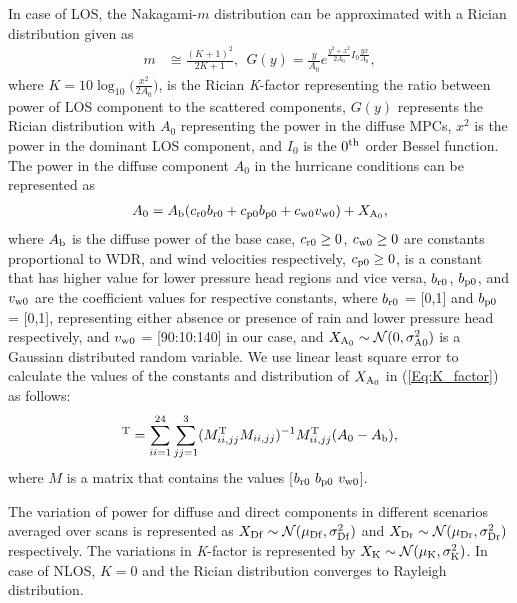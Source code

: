 \documentclass[conference]{IEEEtran}
\begin{document}
In case of LOS, the Nakagami-$m$ distribution can be approximated with a Rician distribution \cite{rician} given as 
\begin{align}
m &\cong \frac{(K+1)^2}{2K + 1}, \ \ G(y)  = \frac{y}{A_{0}}e^{\frac{y^2+x^2}{2A_{0}}I_{0}\frac{yx}{A_{0}}},
\end{align}
 where $K  = 10\log_{10}\big(\frac{x^2}{2A_{0}}\big)$, is the Rician \textit{K}-factor representing the ratio between power of LOS component to the scattered components, $G(y)$ represents the Rician distribution with $A_{0}$ representing the power in the diffuse MPCs, $x^2$ is the power in the dominant LOS component, and $I_{0}$ is the $0^{\rm th}$ order Bessel function. The power in the diffuse component $A_{0}$ in the hurricane conditions can be represented as
\begin{align}
A_{0}= A_{\rm b}(c_{\rm r0}b_{\rm r0} + c_{\rm p0}b_{\rm p0} + c_{\rm w0}v_{\rm w0}) + X_{\rm A_0}, \label{Eq:K_factor}
\end{align}
where $A_{\rm b}$ is the diffuse power of the base case, $c_{\rm r0}\geq0$, $c_{\rm w0}\geq0$ are constants proportional to WDR, and wind velocities respectively, $c_{\rm p0}\geq0$, is a constant that has higher value for lower pressure head regions and vice versa, $b_{\rm r0}$, $b_{\rm p0}$, and $v_{\rm w0}$ are the coefficient values for respective constants, where $b_{\rm r0}$ = [0,1] and $b_{\rm p0}$ = [0,1], representing either absence or presence of rain and lower pressure head respectively, and $v_{\rm w0}$ = [90:10:140] in our case, and $X_{\rm A_0}\sim\mathcal{N}(0,\sigma_{\rm A0}^2)$ is a Gaussian distributed random variable. We use linear least square error to calculate the values of the constants and distribution of $X_{\rm A_0}$ in (\ref{Eq:K_factor}) as follows: 
\begin{align}
[c_{\rm r0}\ c_{\rm p0}\ c_{\rm w0}]^{\rm T} = \sum_{ii=1}^{24}\sum_{jj=1}^{3}(M_{ii, jj}^{\rm T}M_{ ii,jj})^{-1}M_{ii,jj}^{\rm T}(A_{\rm 0}-A_{\rm b}),
\end{align}
 where $M$ is a matrix that contains the values [$b_{\rm r0} \ b_{\rm p0} \ v_{\rm w0}$]. 
 
The variation of power for diffuse and direct components in different scenarios averaged over scans is represented as $X_{\rm Df}\sim\mathcal{N}(\mu_{\rm Df},\sigma_{\rm Df}^2)$ and $X_{\rm Dr}\sim\mathcal{N}(\mu_{\rm Dr},\sigma_{\rm Dr}^2)$ respectively. The variations in \textit{K}-factor is represented  by $X_{\rm K}\sim\mathcal{N}(\mu_{\rm K},\sigma_{\rm K}^2)$. In case of NLOS, $K=0$ and the Rician distribution converges to Rayleigh distribution. 
\end{document}
